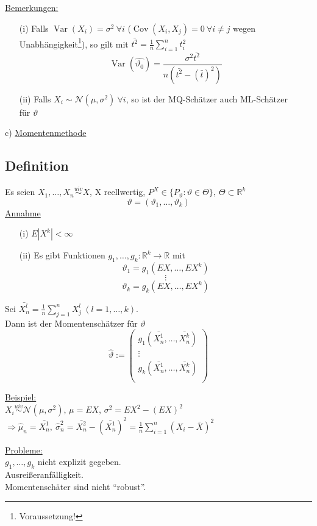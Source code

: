 \documentclass[a4paper,11pt,twoside,titlepage]{article}
\newcommand{\R}{{\mathbb R}}
\newcommand\NN{ \mathcal{N} } %
\newcommand{\uiv}{\ensuremath{\stackrel{uiv}{\sim}}}
\DeclareMathOperator{\var}{Var}
\DeclareMathOperator{\cov}{Cov}
\begin{document}
\underline{Bemerkungen:}
\begin{itemize}
\item[(i) ]Falls $\var(X_i)=\sigma^2\ \forall i$ ($\cov(X_i,X_j)=0\ \forall i\neq j $
wegen Unabhängigkeit\footnote{Voraussetzung!}), so gilt mit $\bar{t^2}=\frac1n\sum_{i=1}^nt_i^2$
$$\var(\hat{\vartheta_0})=\frac{\sigma^2\bar{t^2}}{n(\bar{t^2}-(\bar{t})^2)}$$
\item[(ii) ]Falls $X_i\sim \NN(\mu,\sigma^2)\ \forall i$, so ist der MQ-Schätzer auch ML-Schätzer\\ für $\vartheta$
\end{itemize}
\newpage
c) \underline{Momentenmethode}
\subsection{Definition}
Es seien $X_1,\ldots , X_n\uiv X$, X reellwertig, $P^X\in \{ P_{\vartheta } : \vartheta \in \Theta \},\ \Theta\subset\R^k$
\[\vartheta = (\vartheta_1 ,\ldots,\vartheta_k )\]
\underline{Annahme}
\begin{itemize}
\item[(i) ]$ E\left|X^k\right| < \infty $
\item[(ii) ]Es gibt Funktionen $g_1,\ldots,g_k:\R^k\rightarrow\R$ mit 
$$\vartheta_1=g_1(EX,\ldots,EX^k)$$
$$\vdots$$
$$\vartheta_k=g_k(EX,\ldots,EX^k)$$
\end{itemize}

Sei $\bar{X^l_n}=\frac1n\sum_{j=1}^nX_j^l\ (l=1,\ldots,k)$.\\
Dann ist der Momentenschätzer für $\vartheta$ 
$$\hat{\vartheta}:=
\begin{pmatrix}
	g_1(\bar{X_n^1},\ldots,\bar{X_n^k})\\
	\vdots\\
	g_k(\bar{X_n^1},\ldots,\bar{X_n^k})\\
\end{pmatrix}$$

\underline{Beispiel:}\\
$X_i\uiv \NN(\mu, \sigma^2)$, $\mu=EX$, $\sigma^2=EX^2-(EX)^2$\\
$\Rightarrow \hat\mu_n=\bar{X_n^1},\ \hat\sigma_n^2=\bar{X_n^2}-(\bar{X_n^1})^2=\frac1n\sum_{i=1}^n(X_i-\bar{X})^2$

\underline{Probleme:}\\
$g_1,\ldots,g_k$ nicht explizit gegeben.\\
Ausreißeranfälligkeit.\\
Momentenschäter sind nicht "`robust"'.
\end{document}

